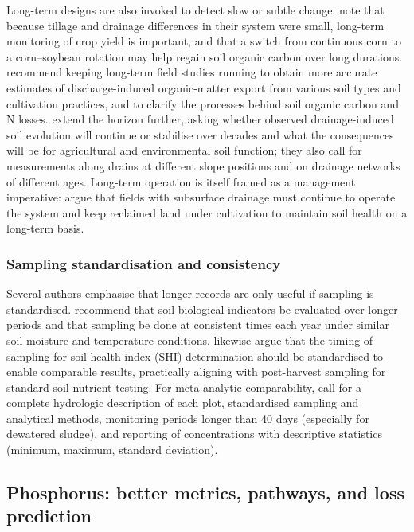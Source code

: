 Long-term designs are also invoked to detect slow or subtle change. \textcite{Kumar2014} note that because tillage and drainage differences in their system were small, long-term monitoring of crop yield is important, and that a switch from continuous corn to a corn--soybean rotation may help regain soil organic carbon over long durations. \textcite{Manninen2023} recommend keeping long-term field studies running to obtain more accurate estimates of discharge-induced organic-matter export from various soil types and cultivation practices, and to clarify the processes behind soil organic carbon and N losses. \textcite{Frison2009} extend the horizon further, asking whether observed drainage-induced soil evolution will continue or stabilise over decades and what the consequences will be for agricultural and environmental soil function; they also call for measurements along drains at different slope positions and on drainage networks of different ages. Long-term operation is itself framed as a management imperative: \textcite{Singh2007} argue that fields with subsurface drainage must continue to operate the system and keep reclaimed land under cultivation to maintain soil health on a long-term basis.

\subsubsection{Sampling standardisation and consistency}

Several authors emphasise that longer records are only useful if sampling is standardised. \textcite{Sherbine2023} recommend that soil biological indicators be evaluated over longer periods and that sampling be done at consistent times each year under similar soil moisture and temperature conditions. \textcite{Li2023b} likewise argue that the timing of sampling for soil health index (SHI) determination should be standardised to enable comparable results, practically aligning with post-harvest sampling for standard soil nutrient testing. For meta-analytic comparability, \textcite{Ghirardini2019} call for a complete hydrologic description of each plot, standardised sampling and analytical methods, monitoring periods longer than 40 days (especially for dewatered sludge), and reporting of concentrations with descriptive statistics (minimum, maximum, standard deviation).

\subsection{Phosphorus: better metrics, pathways, and loss prediction}

